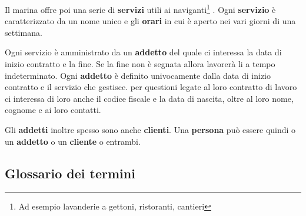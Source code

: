 Il marina offre poi una serie di \textbf{servizi} utili ai naviganti\footnote{Ad esempio lavanderie a gettoni, ristoranti, cantieri} . Ogni \textbf{servizio} è caratterizzato da un nome unico e gli \textbf{orari} in cui è aperto nei vari giorni di una settimana.

Ogni servizio è amministrato da un \textbf{addetto} del quale ci interessa la data di inizio contratto e la fine. Se la fine non è segnata allora lavorerà li a tempo indeterminato. Ogni \textbf{addetto} è definito univocamente dalla data di inizio contratto e il servizio che gestisce. per questioni legate al loro contratto di lavoro ci interessa di loro anche il codice fiscale e la data di nascita, oltre al loro nome, cognome e ai loro contatti.

Gli \textbf{addetti} inoltre spesso sono anche \textbf{clienti}. Una \textbf{persona} può essere quindi o un \textbf{addetto} o un \textbf{cliente} o entrambi.

\subsection{Glossario dei termini}

